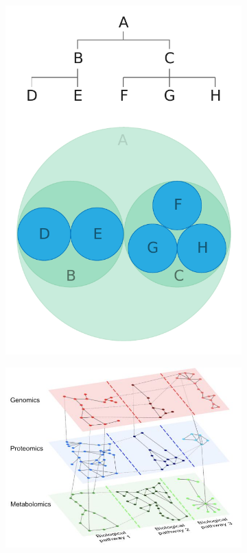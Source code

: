 \begin{figure}[h]
    \centering
    \begin{subfigure}[b]{0.40\columnwidth}
        \centering
        \includegraphics[width=\textwidth, trim={0 0 0 4.3cm},clip]{graphics/circle_packing.pdf}
        \label{fig:hierarchicalCirclePlot}
    \end{subfigure}
    \begin{subfigure}[b]{0.50\columnwidth}
      \centering
      \includegraphics[width=\textwidth]{graphics/2dmultilayerVis.jpg}

\end{subfigure}
\end{figure}
